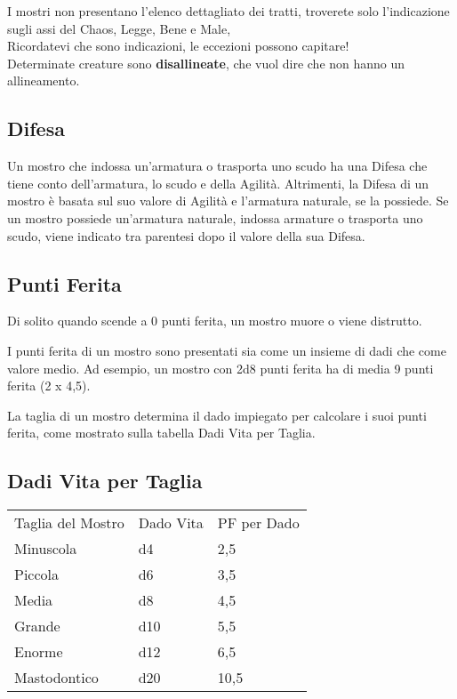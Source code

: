 I mostri non presentano l'elenco dettagliato dei tratti, troverete solo l'indicazione sugli assi del Chaos, Legge, Bene e Male,\\
Ricordatevi che sono indicazioni, le eccezioni possono capitare!\\

Determinate creature  sono \textbf{disallineate}, che vuol dire che non hanno un allineamento.

\subsection{Difesa}

Un mostro che indossa un'armatura o trasporta uno scudo ha una Difesa che tiene conto dell'armatura, lo scudo e della Agilità. Altrimenti, la Difesa di un mostro è basata sul suo valore di Agilità e l'armatura naturale, se la possiede. Se un mostro possiede un'armatura naturale, indossa armature o trasporta uno scudo, viene indicato tra parentesi dopo il valore della sua Difesa.

\subsection{Punti Ferita}

Di solito quando scende a 0 punti ferita, un mostro muore o viene
distrutto.

I punti ferita di un mostro sono presentati sia come un insieme di dadi
che come valore medio. Ad esempio, un mostro con 2d8 punti ferita ha di
media 9 punti ferita (2 x 4,5).

La taglia di un mostro determina il dado impiegato per calcolare i suoi
punti ferita, come mostrato sulla tabella Dadi Vita per Taglia.

\subsection{Dadi Vita per Taglia}

\medskip
\begin{tabular}{lll}
\toprule
Taglia del Mostro & Dado Vita & PF per Dado\\
Minuscola &d4&2,5\\
Piccola &d6&3,5\\
Media&d8 &4,5\\
Grande&d10&5,5\\
Enorme&d12&6,5\\
Mastodontico&d20&10,5\\
\end{tabular}
\medskip


